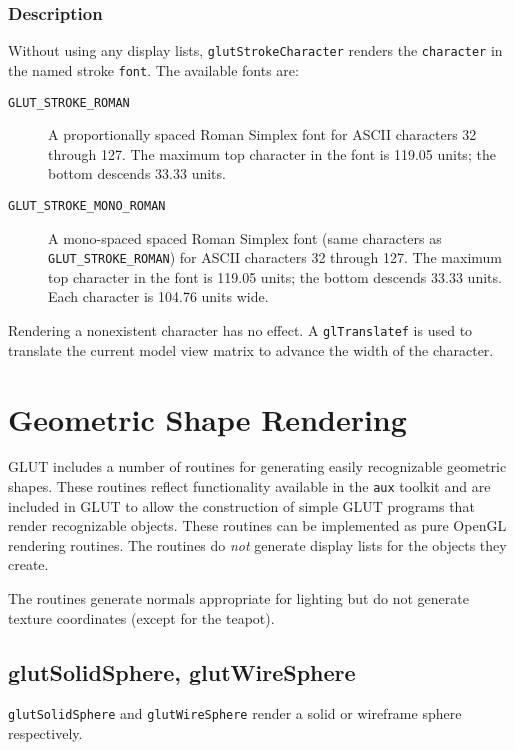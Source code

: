\subsubsection*{Description}

Without using any display lists, {\tt glutStrokeCharacter} renders the {\tt character}
in the named stroke {\tt font}.  The available fonts are:
\begin{description}
\item[{\tt GLUT\_STROKE\_ROMAN}]
A proportionally spaced Roman Simplex font
for ASCII characters 32 through 127.  The maximum top character in the font
is 119.05 units; the bottom descends 33.33 units.

\item[{\tt GLUT\_STROKE\_MONO\_ROMAN}]
A mono-spaced spaced Roman Simplex font (same characters as {\tt GLUT\_STROKE\_ROMAN})
for ASCII characters 32 through 127.  The maximum top character in the font
is 119.05 units; the bottom descends 33.33 units.  Each character is 104.76
units wide.
\end{description}

Rendering a nonexistent character has no effect.  A {\tt glTranslatef} is used
to translate the current model view matrix to advance the width of the
character.

\section{Geometric Shape Rendering}

GLUT includes a number of routines for generating easily recognizable geometric
shapes.  These routines reflect functionality available in the {\tt aux} toolkit
and are included in GLUT to allow the construction of simple GLUT programs that
render recognizable objects.  These routines can be implemented as pure OpenGL
rendering routines.
The routines do {\em not} generate display lists for the objects they create.

The routines generate normals appropriate for lighting but do not generate
texture coordinates (except for the teapot).

\subsection{glutSolidSphere, glutWireSphere}

{\tt glutSolidSphere} and {\tt glutWireSphere} render a solid or wireframe
sphere respectively.

